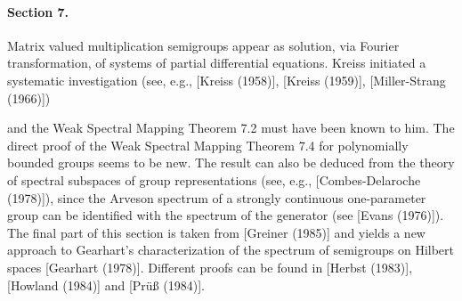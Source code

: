 \paragraph{Section 7.} Matrix valued multiplication semigroups appear as solution, via Fourier transformation, of systems of partial differential equations.
Kreiss initiated a systematic investigation (see, e.g., [Kreiss (1958)], [Kreiss (1959)], [Miller-Strang (1966)])


\newpage
 and the Weak Spectral Mapping Theorem 7.2 must have been known to him. The direct proof of the Weak Spectral Mapping Theorem 7.4 for polynomially bounded groups seems to be new. The result can also be deduced from the theory of spectral subspaces of group representations (see, e.g., [Combes-Delaroche (1978)]), since the Arveson spectrum of a strongly continuous one-parameter group can be identified with the spectrum of the generator (see [Evans (1976)]). The final part of this section is taken from [Greiner (1985)] and yields a new approach to Gearhart's characterization of the spectrum of semigroups on Hilbert spaces [Gearhart (1978)]. Different proofs can be found in [Herbst (1983)], [Howland (1984)] and [Prüß (1984)].



